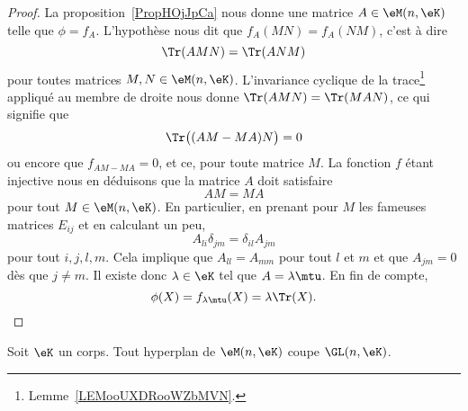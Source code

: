 \begin{proof}
    La proposition~\ref{PropHOjJpCa} nous donne une matrice \( A\in \eM(n,\eK)\) telle que \( \phi=f_A\). L'hypothèse nous dit que \( f_A(MN)=f_A(NM)\), c'est à dire
    \begin{equation}
        \Tr(AMN)=\Tr(ANM)
    \end{equation}
    pour toutes matrices \( M, N\in \eM(n,\eK)\). L'invariance cyclique de la trace\footnote{Lemme~\ref{LEMooUXDRooWZbMVN}.} appliqué au membre de droite nous donne \( \Tr(AMN)=\Tr(MAN)\), ce qui signifie que
    \begin{equation}
        \Tr\big( (AM-MA)N \big)=0
    \end{equation}
    ou encore que \( f_{AM-MA}=0\), et ce, pour toute matrice \( M\). La fonction \( f\) étant injective nous en déduisons que la matrice \( A\) doit satisfaire
    \begin{equation}
        AM=MA
    \end{equation}
    pour tout \( M\in\eM(n,\eK)\). En particulier, en prenant pour \( M \) les fameuses matrices \( E_{ij}\) et en calculant un peu,
    \begin{equation}
        A_{li}\delta_{jm}=\delta_{il}A_{jm}
    \end{equation}
    pour tout \( i,j,l,m\). Cela implique que \( A_{ll}=A_{mm}\) pour tout \( l\) et \( m\) et que \( A_{jm}=0\) dès que \( j\neq m\). Il existe donc \( \lambda\in \eK\) tel que \( A=\lambda\mtu\). En fin de compte,
    \begin{equation}
        \phi(X)=f_{\lambda\mtu}(X)=\lambda\Tr(X).
    \end{equation}
\end{proof}

\begin{corollary}       \label{CorICUOooPsZQrg}
    Soit \( \eK\) un corps. Tout hyperplan de \( \eM(n,\eK)\) coupe \( \GL(n,\eK)\).
\end{corollary}

